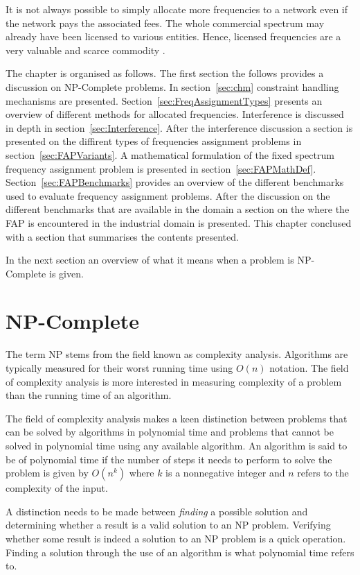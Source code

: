 It is not always possible to simply allocate more frequencies to a network even if the network pays the associated fees. The whole commercial spectrum may already have been licensed to various entities. Hence, licensed frequencies are a very valuable and scarce commodity \cite{FAPRAMColouring,FAPInCell}.

The chapter is organised as follows. The first section the follows provides a discussion on NP-Complete problems. In section~\ref{sec:chm} constraint handling mechanisms are presented. Section~\ref{sec:FreqAssignmentTypes} presents an overview of different methods for allocated frequencies. Interference is discussed in depth in section~\ref{sec:Interference}. After the interference discussion a section is presented on the diffirent types of frequencies assignment problems in section~\ref{sec:FAPVariants}. A mathematical formulation of the fixed spectrum frequency assignment problem is presented in section~\ref{sec:FAPMathDef}. Section~\ref{sec:FAPBenchmarks} provides an overview of the different benchmarks used to evaluate frequency assignment problems. After the discussion on the different benchmarks that are available in the domain a section on the where the FAP is encountered in the industrial domain is presented. This chapter conclused with a section that summarises the contents presented.

In the next section an overview of what it means when a problem is NP-Complete is given.

\section{NP-Complete}
\label{sec:NPComplete}
The term NP stems from the field known as complexity analysis. Algorithms are typically measured for their worst running time using $O(n)$ notation. The field of complexity analysis is more interested in measuring complexity of a problem than the running time of an algorithm\cite{AIModernApproach}.

The field of complexity analysis makes a keen distinction between problems that can be solved by algorithms in polynomial time and problems that cannot be solved in polynomial time using any available algorithm\cite{AIModernApproach}. An algorithm is said to be of polynomial time if the number of steps it needs to perform to solve the problem is given by $O(n^k)$ where $k$ is a nonnegative integer and $n$ refers to the complexity of the input\cite{AIModernApproach}.

A distinction needs to be made between \emph{finding} a possible solution and determining whether a result is a valid solution to an NP problem\cite{AIModernApproach}. Verifying whether some result is indeed a solution to an NP problem is a quick operation\cite{AIModernApproach}. Finding a solution through the use of an algorithm is what polynomial time refers to.

